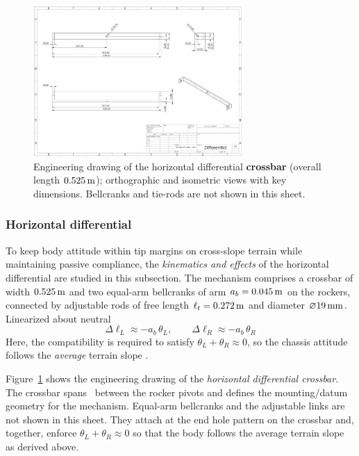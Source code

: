 \documentclass[letterpaper, 10 pt, conference]{ieeeconf}  %
\begin{document}
    \begin{figure}[htbp]
    \centerline{\includegraphics[width=80mm]{figures/hdiff_layout.png}}
    \caption{Engineering drawing of the horizontal differential \textbf{crossbar}
(overall length \(\SI{0.525}{\meter}\)); orthographic and isometric views with key
dimensions. Bellcranks and tie-rods are not shown in this sheet.}
    \label{fig:hdiff}
    \end{figure}


\subsubsection{Horizontal differential}
To keep body attitude within tip margins on cross-slope terrain while maintaining passive compliance, the \emph{kinematics and effects} of the horizontal differential are studied in this subsection. The mechanism comprises a crossbar of width \(\SI{0.525}{\meter}\) and two equal-arm bellcranks of arm \(a_b=\SI{0.045}{\meter}\) on the rockers, connected by adjustable rods of free length \(\ell_t=\SI{0.272}{\meter}\) and diameter \(\varnothing\SI{19}{\milli\meter}\). Linearized about neutral
\begin{equation}
\Delta \ell_L \approx -a_b\,\theta_L,\qquad
\Delta \ell_R \approx -a_b\,\theta_R
\end{equation}
Here, the compatibility is required to satisfy \(\theta_L+\theta_R \approx 0\), so the chassis attitude follows the \emph{average} terrain slope \cite{rivellini1993}.

Figure~\ref{fig:hdiff} shows the engineering drawing of the \emph{horizontal differential crossbar}. The crossbar spans \Lcross\ between the rocker pivots and defines the mounting/datum geometry for the mechanism. Equal-arm bellcranks and the adjustable links are not shown in this sheet. They attach at the end hole pattern on the crossbar and, together, enforce \(\theta_L+\theta_R\approx 0\) so that the body follows the average terrain slope as derived above.
\end{document}
